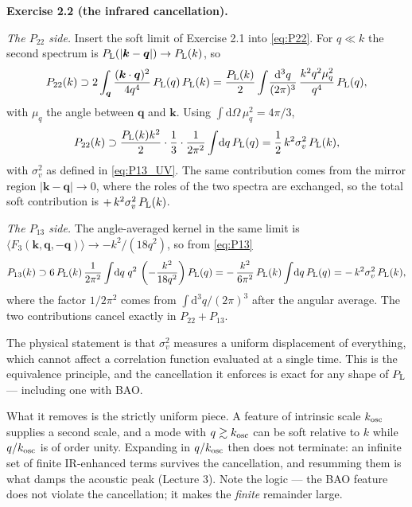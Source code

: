 \documentclass[a4paper,11pt]{article}
\newcommand{\vq}{\bm{q}}
\newcommand{\vk}{\bm{k}}
\def\Plin{P_{\rm L}}
\newcommand{\dd}{\mathrm{d}}
\newenvironment{solution}[1]
  {\par\medskip\noindent\textbf{#1}\par\nobreak\smallskip}
  {\par\medskip}
\begin{document}
\begin{solution}{Exercise 2.2 (the infrared cancellation).}
\emph{The $P_{22}$ side.} Insert the soft limit of Exercise 2.1 into
\eqref{eq:P22}. For $q \ll k$ the second spectrum is
$\Plin(|\vk-\vq|) \to \Plin(k)$, so
\begin{equation*}
P_{22}(k) \supset 2\int_{\vq} \frac{(\vk\cdot\vq)^2}{4q^4}\,
\Plin(q)\,\Plin(k)
= \frac{\Plin(k)}{2}\int\!\frac{\dd^3q}{(2\pi)^3}\,
\frac{k^2q^2\mu_q^2}{q^4}\,\Plin(q) ,
\end{equation*}
with $\mu_q$ the angle between $\vq$ and $\vk$. Using
$\int \dd\Omega\,\mu_q^2 = 4\pi/3$,
\begin{equation*}
P_{22}(k) \supset \frac{\Plin(k)k^2}{2}\cdot\frac{1}{3}\cdot
\frac{1}{2\pi^2}\int\!\dd q\,\Plin(q)
= \frac{1}{2}\,k^2\sigma_v^2\,\Plin(k) ,
\end{equation*}
with $\sigma_v^2$ as defined in \eqref{eq:P13_UV}. The same contribution comes
from the mirror region $|\vk-\vq| \to 0$, where the roles of the two spectra are
exchanged, so the total soft contribution is
$+\,k^2\sigma_v^2\,\Plin(k)$.

\emph{The $P_{13}$ side.} The angle-averaged kernel in the same limit is
$\langle F_3(\vk,\vq,-\vq)\rangle \to -k^2/(18q^2)$, so from \eqref{eq:P13}
\begin{equation*}
P_{13}(k) \supset 6\,\Plin(k)\,\frac{1}{2\pi^2}\int\!\dd q\;q^2\,
\left(-\frac{k^2}{18q^2}\right)\Plin(q)
= -\,\frac{k^2}{6\pi^2}\,\Plin(k)\int\!\dd q\,\Plin(q)
= -\,k^2\sigma_v^2\,\Plin(k) ,
\end{equation*}
where the factor $1/2\pi^2$ comes from $\int\dd^3q/(2\pi)^3$ after the angular
average. The two contributions cancel exactly in $P_{22}+P_{13}$.

The physical statement is that $\sigma_v^2$ measures a uniform displacement of
everything, which cannot affect a correlation function evaluated at a single
time. This is the equivalence principle, and the cancellation it enforces is
exact for any shape of $\Plin$ --- including one with BAO.

What it removes is the strictly uniform piece. A feature of intrinsic scale
$k_{\rm osc}$ supplies a second scale, and a mode with $q \gtrsim k_{\rm osc}$
can be soft relative to $k$ while $q/k_{\rm osc}$ is of order unity. Expanding
in $q/k_{\rm osc}$ then does not terminate: an infinite set of finite
IR-enhanced terms survives the cancellation, and resumming them is what damps
the acoustic peak (Lecture 3). Note the logic --- the BAO feature does not
violate the cancellation; it makes the \emph{finite} remainder large.
\end{solution}
\end{document}

